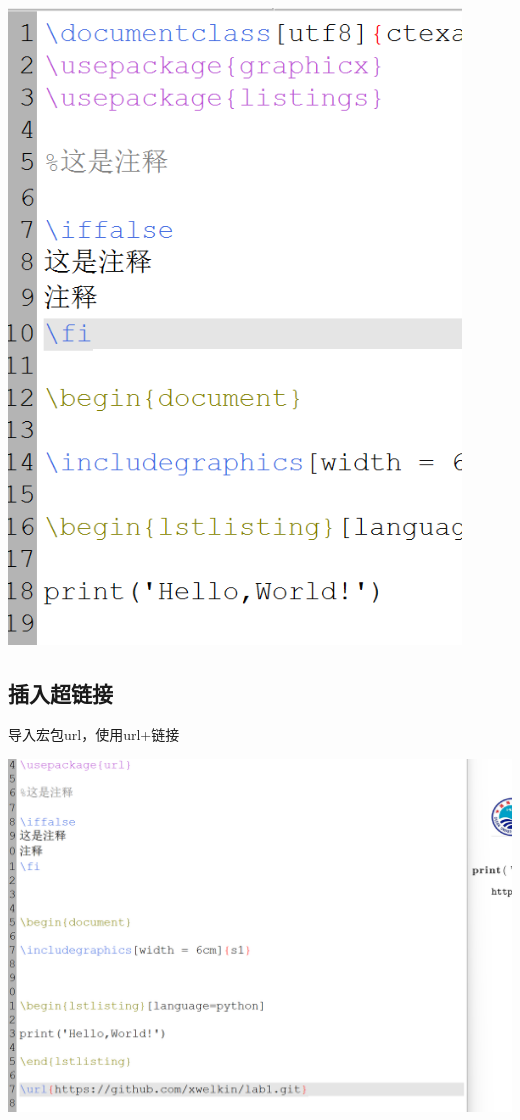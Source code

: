\documentclass[UTF8,a4paper]{ctexart}
\begin{document}
\begin{sloppypar}
	\includegraphics[width = 12cm]{18}
	
	\subsection{插入超链接}
	导入宏包url，使用url+链接
	
	\includegraphics[width = 16cm]{19}
	

\end{sloppypar}
\end{document}
